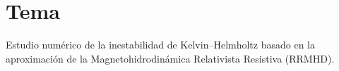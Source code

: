 \section{Tema}
\noindent Estudio numérico de la inestabilidad de Kelvin–Helmholtz basado en la aproximación de la Magnetohidrodinámica Relativista Resistiva (RRMHD).